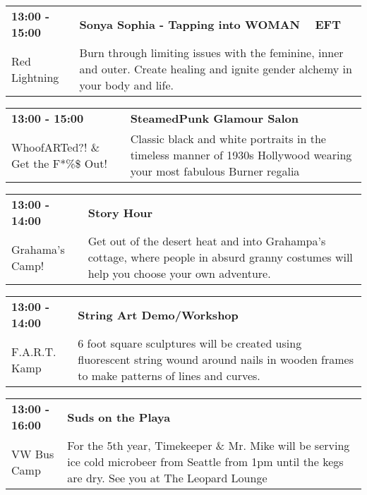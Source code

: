 \begin{tabular}{ p{1in} p{2.2in} }
    \textbf{13:00 - 15:00} & \textbf{Sonya Sophia - Tapping into WOMAN ~ EFT } \\
    Red Lightning \newline  & Burn through limiting issues with the feminine, inner and outer. Create healing and ignite gender alchemy in your body and life. \\
    \hline 
\end{tabular}
    
\begin{tabular}{ p{1in} p{2.2in} }
    \textbf{13:00 - 15:00} & \textbf{SteamedPunk Glamour Salon} \\
    WhoofARTed?! \& Get the F*\%\$ Out! \newline  & Classic black and white portraits in the timeless manner of 1930s Hollywood wearing your most fabulous Burner regalia \\
    \hline 
\end{tabular}
    
\begin{tabular}{ p{1in} p{2.2in} }
    \textbf{13:00 - 14:00} & \textbf{Story Hour} \\
    Grahama's Camp! \newline  & Get out of the desert heat and into Grahampa's cottage, where people in absurd granny costumes will help you choose your own adventure. \\
    \hline 
\end{tabular}
    
\begin{tabular}{ p{1in} p{2.2in} }
    \textbf{13:00 - 14:00} & \textbf{String Art Demo/Workshop} \\
    F.A.R.T. Kamp \newline  & 6 foot square sculptures will be created using fluorescent string wound around nails in wooden frames to make patterns of lines and curves. \\
    \hline 
\end{tabular}
    
\begin{tabular}{ p{1in} p{2.2in} }
    \textbf{13:00 - 16:00} & \textbf{Suds on the Playa} \\
    VW Bus Camp \newline  & For the 5th year, Timekeeper \& Mr. Mike will be serving ice cold microbeer from Seattle from 1pm until the kegs are dry. See you at The Leopard Lounge \\
    \hline 
\end{tabular}
    
